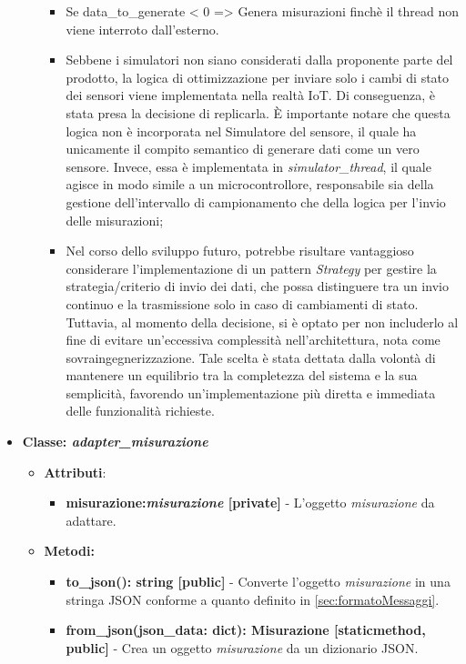 \begin{itemize}
\begin{itemize}
\begin{itemize}
            \item Se data\_to\_generate < 0 => Genera misurazioni finchè il thread non viene interroto dall'esterno.
            \item Sebbene i simulatori non siano considerati dalla proponente parte del prodotto, la logica di ottimizzazione per inviare solo i cambi di stato dei sensori viene implementata nella realtà IoT. Di conseguenza, è stata presa la decisione di replicarla. È importante notare che questa logica non è incorporata nel Simulatore del sensore, il quale ha unicamente il compito semantico di generare dati come un vero sensore. Invece, essa è implementata in \textit{simulator\_thread}, il quale agisce in modo simile a un microcontrollore, responsabile sia della gestione dell'intervallo di campionamento che della logica per l'invio delle misurazioni;
            \item Nel corso dello sviluppo futuro, potrebbe risultare vantaggioso considerare l'implementazione di un pattern \textit{Strategy} per gestire la strategia/criterio di invio dei dati, che possa distinguere tra un invio continuo e la trasmissione solo in caso di cambiamenti di stato. Tuttavia, al momento della decisione, si è optato per non includerlo al fine di evitare un'eccessiva complessità nell'architettura, nota come sovraingegnerizzazione. Tale scelta è stata dettata dalla volontà di mantenere un equilibrio tra la completezza del sistema e la sua semplicità, favorendo un'implementazione più diretta e immediata delle funzionalità richieste.
        \end{itemize}
    \end{itemize}
    \item{\textbf{Classe: \textit{adapter\_misurazione}}}
    \begin{itemize}
        \item\textbf{Attributi}:
        \begin{itemize}
            \item \textbf{misurazione:\textit{misurazione} [private]} - L'oggetto \textit{misurazione} da adattare.
        \end{itemize}
        \item \textbf{Metodi: }
        \begin{itemize}
            \item \textbf{to\_json(): string [public]} - Converte l'oggetto \textit{misurazione} in una stringa JSON conforme a quanto definito in \ref{sec:formatoMessaggi}.
            \item \textbf{from\_json(json\_data: dict): Misurazione [staticmethod, public]} - Crea un oggetto \textit{misurazione} da un dizionario JSON.

\end{itemize}
\end{itemize}
\end{itemize}
